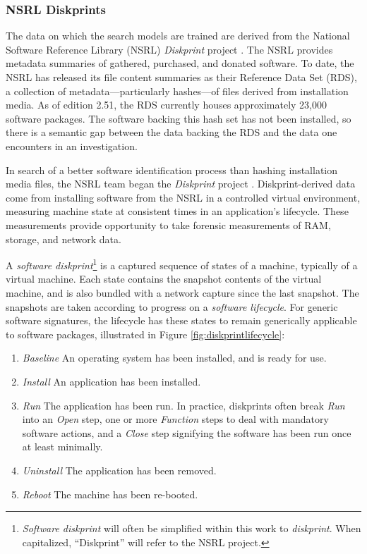 \documentclass[11pt]{ucthesis}
\theoremstyle{plain}
\theoremstyle{definition}
\begin{document}
\subsubsection{NSRL Diskprints}

The data on which the search models are trained are derived from the National Software Reference Library (NSRL) \emph{Diskprint} project \cite{tebbutt:aafs14}.  The NSRL provides metadata summaries of gathered, purchased, and donated software.  To date, the NSRL has released its file content summaries as their Reference Data Set (RDS), a collection of metadata---particularly hashes---of files derived from installation media.  As of edition 2.51, the RDS currently houses approximately 23,000 software packages.  The software backing this hash set has not been installed, so there is a semantic gap between the data backing the RDS and the data one encounters in an investigation.

In search of a better software identification process than hashing installation media files, the NSRL team began the \emph{Diskprint} project \cite{tebbutt:aafs14}.  Diskprint-derived data come from installing software from the NSRL in a controlled virtual environment, measuring machine state at consistent times in an application's lifecycle.  These measurements provide opportunity to take forensic measurements of RAM, storage, and network data.

A \emph{software diskprint}\footnote{\emph{Software diskprint} will often be simplified within this work to \emph{diskprint}.  When capitalized, ``Diskprint'' will refer to the NSRL project.} is a captured sequence of states of a machine, typically of a virtual machine.  Each state contains the snapshot contents of the virtual machine, and is also bundled with a network capture since the last snapshot.  The snapshots are taken according to progress on a \emph{software lifecycle}.  For generic software signatures, the lifecycle has these states to remain generically applicable to software packages, illustrated in Figure \ref{fig:diskprintlifecycle}:

\begin{enumerate}
\item \emph{Baseline} An operating system has been installed, and is ready for use.
\item \emph{Install} An application has been installed.
\item \emph{Run} The application has been run.  In practice, diskprints often break \emph{Run} into an \emph{Open} step, one or more \emph{Function} steps to deal with mandatory software actions, and a \emph{Close} step signifying the software has been run once at least minimally.
\item \emph{Uninstall} The application has been removed.
\item \emph{Reboot} The machine has been re-booted.
\end{enumerate}
\end{document}
